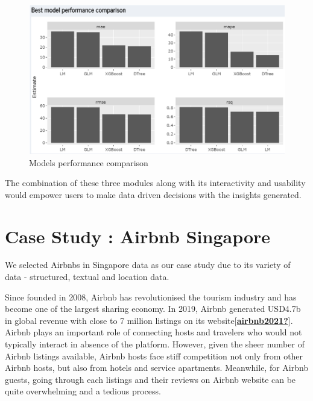 \documentclass{acm_proc_article-sp}
\begin{document}
\begin{figure}[H]

{\centering \includegraphics[width=1\linewidth]{images/mdlcompare} 

}

\caption{Models performance comparison}\label{fig:unnamed-chunk-16}
\end{figure}

The combination of these three modules along with its interactivity and
usability would empower users to make data driven decisions with the
insights generated.

\hypertarget{case-study-airbnb-singapore}{%
\section{Case Study : Airbnb
Singapore}\label{case-study-airbnb-singapore}}

We selected Airbnbs in Singapore data as our case study due to its
variety of data - structured, textual and location data.

Since founded in 2008, Airbnb has revolutionised the tourism industry
and has become one of the largest sharing economy. In 2019, Airbnb
generated USD4.7b in global revenue with close to 7 million listings on
its
website{[}\protect\hyperlink{ref-airbnb2021}{\textbf{airbnb2021?}}{]}.
Airbnb plays an important role of connecting hosts and travelers who
would not typically interact in absence of the platform. However, given
the sheer number of Airbnb listings available, Airbnb hosts face stiff
competition not only from other Airbnb hosts, but also from hotels and
service apartments. Meanwhile, for Airbnb guests, going through each
listings and their reviews on Airbnb website can be quite overwhelming
and a tedious process.
\end{document}
